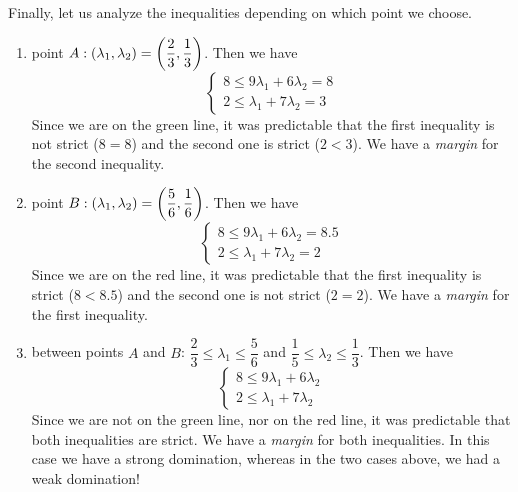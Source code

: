 Finally, let us analyze the inequalities depending on which point we choose. 
\begin{enumerate}
    \item point $A: \left( \lambda_{1},\lambda_{2} \right) = \left( \dfrac{2}{3},\dfrac{1}{3} \right)$.
    Then we have
    \begin{equation*}
    \begin{cases}
    8 \leq 9 \lambda_{1} + 6 \lambda_{2} = 8  \\
    2 \leq \lambda_{1} + 7 \lambda_{2} = 3
    \end{cases}
    \end{equation*}
    Since we are on the green line, it was predictable that the first inequality is not strict ($8 = 8$) and the second one is strict ($2 < 3$). We have a \textit{margin} for the second inequality.
    
    \item point $B: \left( \lambda_{1},\lambda_{2} \right) = \left( \dfrac{5}{6},\dfrac{1}{6} \right)$.
    Then we have
    \begin{equation*}
    \begin{cases}
    8 \leq 9 \lambda_{1} + 6 \lambda_{2} = 8.5  \\
    2 \leq \lambda_{1} + 7 \lambda_{2} = 2
    \end{cases}
    \end{equation*}
    Since we are on the red line, it was predictable that the first inequality is strict ($8 < 8.5$) and the second one is not strict ($2 = 2$). We have a \textit{margin} for the first inequality.
    
    \item between points $A$ and $B$: $\dfrac{2}{3} \leq \lambda_{1} \leq \dfrac{5}{6}$ and $\dfrac{1}{5} \leq \lambda_{2} \leq \dfrac{1}{3}$.
    Then we have
    \begin{equation*}
    \begin{cases}
    8 \leq 9 \lambda_{1} + 6 \lambda_{2}  \\
    2 \leq \lambda_{1} + 7 \lambda_{2}
    \end{cases}
    \end{equation*}
    Since we are not on the green line, nor on the red line, it was predictable that both inequalities are strict. We have a \textit{margin} for both inequalities. In this case we have a strong domination, whereas in the two cases above, we had a weak domination!
    
    
\end{enumerate}
    
    
    
    
    




        
